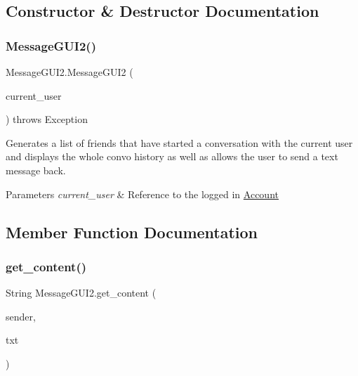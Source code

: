 \subsection{Constructor \& Destructor Documentation}
\mbox{\label{class_message_g_u_i2_a6cb5dea82c3d14b3bc925ee904219840}} 
\subsubsection{\texorpdfstring{Message\+G\+U\+I2()}{MessageGUI2()}}
{\footnotesize\ttfamily Message\+G\+U\+I2.\+Message\+G\+U\+I2 (\begin{DoxyParamCaption}\item[{\hyperlink{class_account}{Account}}]{current\+\_\+user }\end{DoxyParamCaption}) throws Exception}



Generates a list of friends that have started a conversation with the current user and displays the whole convo history as well as allows the user to send a text message back. 


\begin{DoxyParams}{Parameters}
{\em current\+\_\+user} & Reference to the logged in \hyperlink{class_account}{Account} \\
\hline
\end{DoxyParams}


\subsection{Member Function Documentation}
\mbox{\label{class_message_g_u_i2_a3dfc57369fa2003712cebd9c2cf40fd1}} 
\subsubsection{\texorpdfstring{get\+\_\+content()}{get\_content()}}
{\footnotesize\ttfamily String Message\+G\+U\+I2.\+get\+\_\+content (\begin{DoxyParamCaption}\item[{String}]{sender,  }\item[{Array\+List$<$ \hyperlink{class_text_message}{Text\+Message} $>$}]{txt }\end{DoxyParamCaption})}


